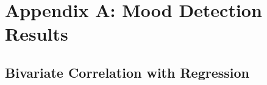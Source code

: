 
\chapter{Appendix A: Mood Detection Results} %

\label{AppendixA} %
\label{sec:appendixa}


\section{Bivariate Correlation with Regression}
\label{sec:bivariatediagram}

